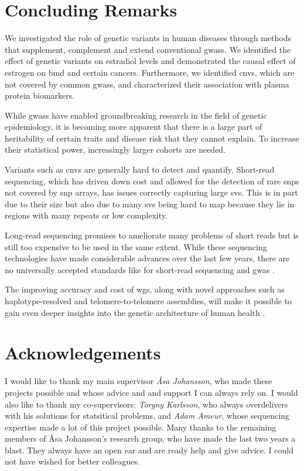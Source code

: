 \documentclass[twoside=false]{scrbook}
\begin{document}
\chapter{Concluding Remarks}
We investigated the role of genetic variants in human diseases through methods that supplement, complement and extend conventional \glspl{gwas}.
We identified the effect of genetic variants on estradiol levels and demonstrated the causal effect of estrogen on \gls{bmd} and certain cancers.
Furthermore, we identified \glspl{cnv}, which are not covered by common \glspl{gwas}, and characterized their association with plasma protein biomarkers.

While \glspl{gwas} have enabled groundbreaking research in the field of genetic epidemiology, it is becoming more apparent that there is a large part of heritability of certain traits and disease risk that they cannot explain.
To increase their statistical power, increasingly larger cohorts are needed.

Variants such as \glspl{cnv} are generally hard to detect and quantify.
Short-read sequencing, which has driven down cost and allowed for the detection of rare \glspl{snp} not covered by \gls{snp} arrays, has issues correctly capturing large \glspl{sv}.
This is in part due to their size but also due to many \glspl{sv} being hard to map because they lie in regions with many repeats or low complexity.

Long-read sequencing promises to ameliorate many problems of short reads but is still too expensive to be used in the same extent.
While these sequencing technologies have made considerable advances over the last few years, there are no universally accepted standards like for short-read sequencing and \gls{gwas} \cite{DeCoster2021}.

The improving accuracy and cost of \gls{wgs}, along with novel approaches such as haplotype-resolved and telomere-to-telomere assemblies, will make it possible to gain even deeper insights into the genetic architecture of human health \cite{Logsdon2021,Porubsky2021}.

\backmatter

\chapter{Acknowledgements}
I would like to thank my main supervisor \textit{Åsa Johansson}, who made these projects possible and whose advice and and support I can always rely on.
I would also like to thank my co-supervisors: \textit{Torgny Karlsson}, who always overdelivers with his solutions for statsitical problems, and \textit{Adam Ameur}, whose sequencing expertise made a lot of this project possible.
Many thanks to the remaining members of Åsa Johansson's research group, who have made the last two years a blast.
They always have an open ear and are ready help and give advice.
I could not have wished for better colleagues.
\end{document}
